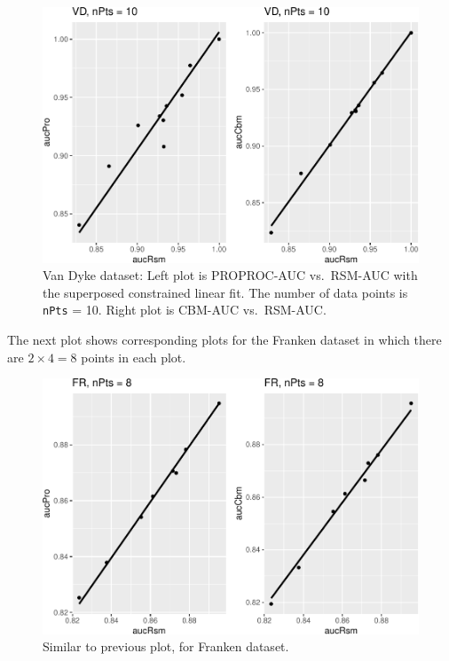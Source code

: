 \documentclass[
]{book}
\begin{document}
\begin{figure}
\centering
\includegraphics{10-rsm-3-fits_files/figure-latex/rsm-3-fits-plots-2-1.pdf}
\caption{\label{fig:rsm-3-fits-plots-2}Van Dyke dataset: Left plot is PROPROC-AUC vs.~RSM-AUC with the superposed constrained linear fit. The number of data points is \texttt{nPts} = 10. Right plot is CBM-AUC vs.~RSM-AUC.}
\end{figure}

The next plot shows corresponding plots for the Franken dataset in which there are \(2\times 4 = 8\) points in each plot.

\begin{figure}
\centering
\includegraphics{10-rsm-3-fits_files/figure-latex/rsm-3-fits-plots-3-1.pdf}
\caption{\label{fig:rsm-3-fits-plots-3}Similar to previous plot, for Franken dataset.}
\end{figure}
\end{document}
